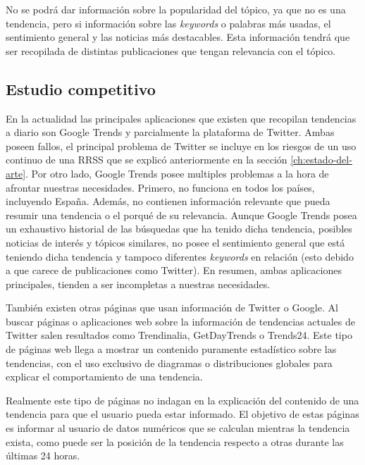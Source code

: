 \vspace{0.3cm}

No se podrá dar información sobre la popularidad del tópico, ya que no es una tendencia, pero si información sobre las \textit{keywords} o palabras más usadas, el sentimiento general y las noticias más destacables. Esta información tendrá que ser recopilada de distintas publicaciones que tengan relevancia con el tópico.

\subsection{Estudio competitivo}

En la actualidad las principales aplicaciones que existen que recopilan tendencias a diario son Google Trends y parcialmente la plataforma de Twitter. Ambas poseen fallos, el principal problema de Twitter se incluye en los riesgos de un uso continuo de una \ac{RRSS} que se explicó anteriormente en la sección \ref{ch:estado-del-arte}. Por otro lado, Google Trends posee multiples problemas a la hora de afrontar nuestras necesidades. Primero, no funciona en todos los países, incluyendo España. Además, no contienen información relevante que pueda resumir una tendencia o el porqué de su relevancia. Aunque Google Trends posea un exhaustivo historial de las búsquedas que ha tenido dicha tendencia, posibles noticias de interés y tópicos similares, no posee el sentimiento general que está teniendo dicha tendencia y tampoco diferentes \textit{keywords} en relación (esto debido a que carece de publicaciones como Twitter). En resumen, ambas aplicaciones principales, tienden a ser incompletas a nuestras necesidades.

\vspace{0.3cm}

También existen otras páginas que usan información de Twitter o Google. Al buscar páginas o aplicaciones web sobre la información de tendencias actuales de Twitter salen resultados como Trendinalia, GetDayTrends o Trends24. Este tipo de páginas web llega a mostrar un contenido puramente estadístico sobre las tendencias, con el uso exclusivo de diagramas o distribuciones globales para explicar el comportamiento de una tendencia.

\vspace{0.3cm}

Realmente este tipo de páginas no indagan en la explicación del contenido de una tendencia para que el usuario pueda estar informado. El objetivo de estas páginas es informar al usuario de datos numéricos que se calculan mientras la tendencia exista, como puede ser la posición de la tendencia respecto a otras durante las últimas 24 horas.

